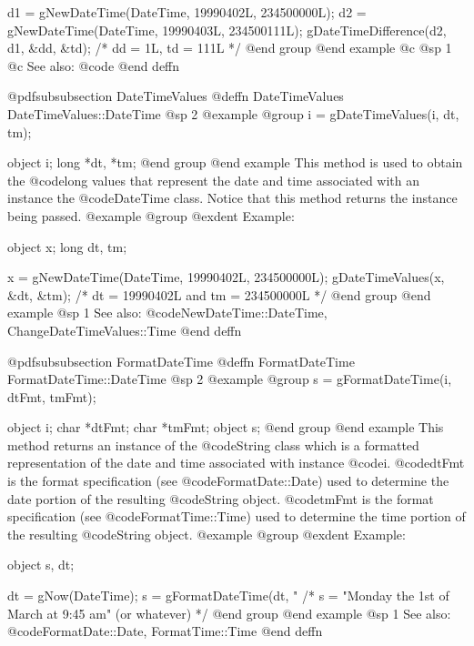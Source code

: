 d1 = gNewDateTime(DateTime, 19990402L, 234500000L);
d2 = gNewDateTime(DateTime, 19990403L, 234500111L);
gDateTimeDifference(d2, d1, &dd, &td);
/*  dd = 1L, td = 111L  */
@end group
@end example
@c @sp 1
@c See also:  @code{}
@end deffn







@pdfsubsubsection {DateTimeValues}
@deffn {DateTimeValues} DateTimeValues::DateTime
@sp 2
@example
@group
i = gDateTimeValues(i, dt, tm);

object  i;
long    *dt, *tm;
@end group
@end example
This method is used to obtain the @code{long} values that represent
the date and time associated with an instance the @code{DateTime} class.
Notice that this method returns the instance being passed.  
@example
@group
@exdent Example:

object  x;
long    dt, tm;

x = gNewDateTime(DateTime, 19990402L, 234500000L);
gDateTimeValues(x, &dt, &tm);
/*  dt = 19990402L and tm = 234500000L  */
@end group
@end example
@sp 1
See also:  @code{NewDateTime::DateTime, ChangeDateTimeValues::Time}
@end deffn










@pdfsubsubsection {FormatDateTime}
@deffn {FormatDateTime} FormatDateTime::DateTime
@sp 2
@example
@group
s = gFormatDateTime(i, dtFmt, tmFmt);

object  i;
char    *dtFmt;
char    *tmFmt;
object  s;
@end group
@end example
This method returns an instance of the @code{String} class which is a
formatted representation of the date and time associated with instance
@code{i}.  @code{dtFmt} is the format specification (see @code{FormatDate::Date})
used to determine the date portion of the resulting @code{String} object.
@code{tmFmt} is the format specification (see @code{FormatTime::Time})
used to determine the time portion of the resulting @code{String} object.
@example
@group
@exdent Example:

object  s, dt;

dt = gNow(DateTime);
s = gFormatDateTime(dt, "%
/*  s = "Monday the 1st of March at 9:45 am" (or whatever)  */
@end group
@end example
@sp 1
See also:  @code{FormatDate::Date, FormatTime::Time}
@end deffn








